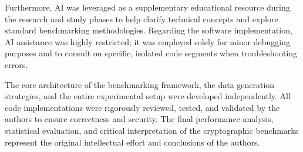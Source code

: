 \documentclass[10pt,a4paper]{article}
\begin{document}
Furthermore, AI was leveraged as a supplementary educational resource during the research and study phases to help clarify technical concepts and explore standard benchmarking methodologies. Regarding the software implementation, AI assistance was highly restricted; it was employed solely for minor debugging purposes and to consult on specific, isolated code segments when troubleshooting errors.

The core architecture of the benchmarking framework, the data generation strategies, and the entire experimental setup were developed independently. All code implementations were rigorously reviewed, tested, and validated by the authors to ensure correctness and security. The final performance analysis, statistical evaluation, and critical interpretation of the cryptographic benchmarks represent the original intellectual effort and conclusions of the authors.
\end{document}
